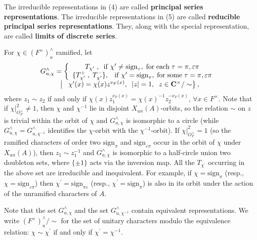 \documentclass[11pt, a4paper]{article}
\begin{document}
The irreducible representations in (4) are called {\bf principal series
representations}. The irreducible representations in (5) are called {\bf %
reducible principal series representations}. They, along with the special
representation, are called {\bf limits of discrete series}.

For $\chi \in (F^{\times })_u^{\wedge }$ ramified, let
\[
\begin{array}{c}
G_{u,\chi }^{\wedge }=\left\{ 
\begin{array}{c}
T_{\chi ^{\prime }}\;,\; {\rm \;if\;}\chi ^{\prime }\neq \mathrm{sign}_\tau ,\;{\rm %
for\;each}\;\tau =\pi ,\varepsilon \pi \\ 
\{T_{\chi ^{\prime }}^{+}\;,\;T_{\chi ^{\prime }}^{-}\},\;\;{\rm \;if\;}\chi
^{\prime }=\mathrm{sign}_\tau ,\;{\rm for\;some}\;\tau =\pi ,\varepsilon \pi
\end{array}
\right. \\ 
\left.\;\middle|\;\;\;\chi ^{\prime }(x)=\chi (x)z^{\nu _F(x)},\;\;|z|=1,\;\;z\in {\bf C}%
^{\times }/\sim\right\},
\end{array}
\]
where $z_1\sim z_2$ if and only if $\chi (x)z_1^{\nu _F(x)}=\chi
(x)^{-1}z_2^{-\nu _F(x)}$, $\forall x\in F^{\times }$. Note that if $\chi |_{O_F^{\times }}^2\neq 1$, then $\chi $ and $\chi ^{-1}$ lie in disjoint $X_{un}(A)$-orbits, so the relation $\sim $ on $z$ is trivial within the orbit of $\chi $ and $G_{u,\chi }^{\wedge }$ is isomorphic to a circle (while $G_{u,\chi }^{\wedge }=G_{u,\chi ^{-1}}^{\wedge }$ identifies the $\chi $-orbit with the $\chi ^{-1}$-orbit). If $\chi |_{O_F^{\times }}^2=1$ (so the ramified characters of order two $\mathrm{sign}_\pi $ and $\mathrm{sign}_{\varepsilon \pi }$ occur in the orbit of $\chi $ under $X_{un}(A)$), then $z_1\sim z_1^{-1}$ and $G_{u,\chi }^{\wedge }$ is isomorphic to a half-circle union two doubleton sets, where $\{\pm 1\}$ acts via the inversion map. All the $T_{\chi ^{\prime }}$ occurring in the above set are irreducible and inequivalent. For example, if $\chi =\mathrm{sign}_\pi $ (resp., $\chi =\mathrm{sign}_{\varepsilon \pi }$) then $\chi ^{\prime }=\mathrm{sign}_{\pi \varepsilon }$ (resp., $\chi ^{\prime }=\mathrm{sign}_\pi $) is also in its orbit under the action of the unramified characters of $A$.

Note that the set $G_{u,\chi }^{\wedge }$ and the set $G_{u,\chi
^{-1}}^{\wedge }$ contain equivalent representations. We write $(F^{\times
})_u^{\wedge }/\sim$ for the set of unitary characters modulo the
equivalence relation: $\chi \sim \chi ^{\prime }$ if and only if $\chi
^{\prime }=\chi ^{-1}$.
\end{document}
